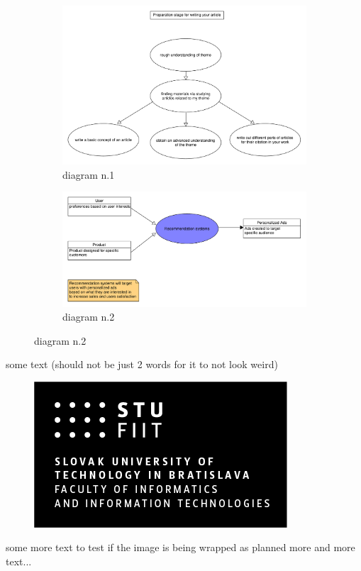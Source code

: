 \documentclass[10pt,twoside,english,a4paper]{article}
\begin{document}
\begin{figure}[H]
	\caption{UMLet diagrams}
	\label{fig:umletdiag}
	\begin{subfigure}[b]{0.5\textwidth}
		\centering
		\includegraphics[width=1\textwidth]{diagram_1.pdf}
		\caption{diagram n.1}
	\end{subfigure}
	\begin{subfigure}[b]{0.5\textwidth}
		\centering
		\includegraphics[width=1\textwidth]{diagram_2.pdf}
		\caption{diagram n.2}
	\end{subfigure}
\end{figure}

some text (should not be just 2 words for it to not look weird)
\begin{figure}
    \includegraphics[scale=0.3]{STU-FIIT-ancnv.png}
\end{figure}
some more text to test if the image is being wrapped as planned
\newline more and more text...



% 
\end{document}
